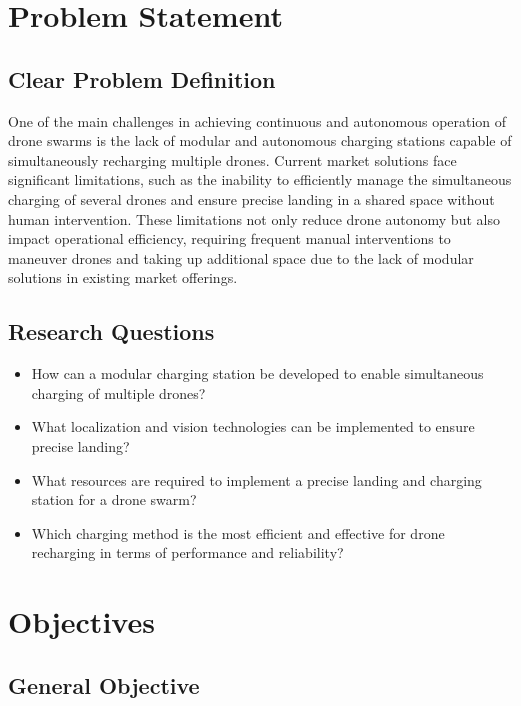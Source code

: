 \section{Problem Statement}

\subsection{Clear Problem Definition}

One of the main challenges in achieving continuous and autonomous operation of drone swarms is the lack of modular and autonomous charging stations capable of simultaneously recharging multiple drones. Current market solutions face significant limitations, such as the inability to efficiently manage the simultaneous charging of several drones and ensure precise landing in a shared space without human intervention. These limitations not only reduce drone autonomy but also impact operational efficiency, requiring frequent manual interventions to maneuver drones and taking up additional space due to the lack of modular solutions in existing market offerings.

\subsection{Research Questions}

\begin{itemize}
    \item How can a modular charging station be developed to enable simultaneous charging of multiple drones?
    \item What localization and vision technologies can be implemented to ensure precise landing?
    \item What resources are required to implement a precise landing and charging station for a drone swarm?
    \item Which charging method is the most efficient and effective for drone recharging in terms of performance and reliability?
\end{itemize}

\section{Objectives}

\subsection{General Objective}

